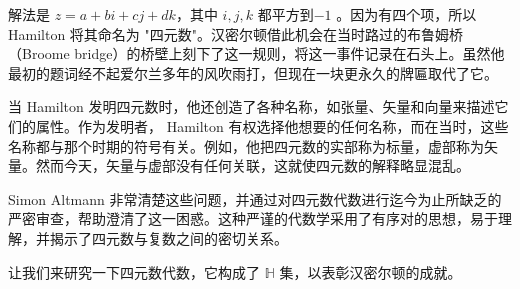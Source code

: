 解法是 $z=a+b i+c j+d k$，其中 $i,j,k$ 都平方到$ -1$ 。因为有四个项，所以 Hamilton 将其命名为 "四元数"。汉密尔顿借此机会在当时路过的布鲁姆桥（Broome bridge）的桥壁上刻下了这一规则，将这一事件记录在石头上。虽然他最初的题词经不起爱尔兰多年的风吹雨打，但现在一块更永久的牌匾取代了它。

当 Hamilton 发明四元数时，他还创造了各种名称，如张量、矢量和向量来描述它们的属性。作为发明者， Hamilton 有权选择他想要的任何名称，而在当时，这些名称都与那个时期的符号有关。例如，他把四元数的实部称为标量，虚部称为矢量。然而今天，矢量与虚部没有任何关联，这就使四元数的解释略显混乱。

Simon Altmann 非常清楚这些问题，并通过对四元数代数进行迄今为止所缺乏的严密审查，帮助澄清了这一困惑。这种严谨的代数学采用了有序对的思想，易于理解，并揭示了四元数与复数之间的密切关系。

让我们来研究一下四元数代数，它构成了 $\mathbb{H}$ 集，以表彰汉密尔顿的成就。

